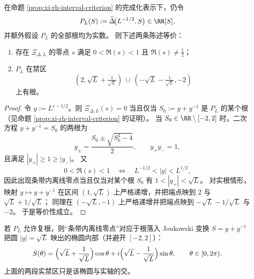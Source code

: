 \begin{proposition}\label{prop:xi-strip-forbidden-real}
在命题 \ref{prop:xi-rh-interval-criterion} 的完成化表示下，仍令
\[
P_L(S):=\widehat\Delta\!\bigl(L^{-1/2},S\bigr)\in\RR[S],
\]
并额外假设 \(P_L\) 的全部根均为实数。
则下述两条陈述等价：
\begin{enumerate}
  \item 存在 \(\Xi_{\Delta,L}\) 的零点 \(s\) 满足 \(0<\Re(s)<1\) 且 \(\Re(s)\neq \tfrac12\)；
  \item \(P_L\) 在禁区
  \[
  (2,\sqrt{L}+\tfrac{1}{\sqrt{L}})\ \cup\ (-\sqrt{L}-\tfrac{1}{\sqrt{L}},-2)
  \]
  上有根。
\end{enumerate}
\end{proposition}
\begin{proof}
令 \(y:=L^{s-1/2}\)。则 \(\Xi_{\Delta,L}(s)=0\) 当且仅当 \(S_0:=y+y^{-1}\) 是 \(P_L\) 的某个根（见命题 \ref{prop:xi-rh-interval-criterion} 的证明）。
当 \(S_0\in\RR\setminus[-2,2]\) 时，二次方程 \(y+y^{-1}=S_0\) 的两根为
\[
y_\pm=\frac{S_0\pm\sqrt{S_0^2-4}}{2},\qquad y_+y_-=1,
\]
且满足 \(|y_+|\ge 1\ge |y_-|\)。
又
\[
0<\Re(s)<1\quad\Longleftrightarrow\quad L^{-1/2}<|y|<L^{1/2},
\]
因此出现条带内离线零点当且仅当对某个根 \(S_0\) 有 \(1<|y_+|<\sqrt{L}\)。
对实根情形，映射 \(y\mapsto y+y^{-1}\) 在区间 \((1,\sqrt{L})\) 上严格递增，并把端点映到 \(2\) 与 \(\sqrt{L}+1/\sqrt{L}\)；
同理在 \((-\sqrt{L},-1)\) 上严格递增并把端点映到 \(-\sqrt{L}-1/\sqrt{L}\) 与 \(-2\)。
于是等价性成立。
\end{proof}

\begin{remark}\label{rem:xi-strip-ellipse-forbidden}
若 \(P_L\) 允许复根，则“条带内离线零点”对应于根落入 Joukowski 变换 \(S=y+y^{-1}\) 把圆 \(|y|=\sqrt{L}\) 映出的椭圆内部（并避开 \([-2,2]\)）：
\[
S(\theta)=\Bigl(\sqrt{L}+\frac{1}{\sqrt{L}}\Bigr)\cos\theta
+i\Bigl(\sqrt{L}-\frac{1}{\sqrt{L}}\Bigr)\sin\theta,\qquad \theta\in[0,2\pi).
\]
上面的两段实禁区只是该椭圆与实轴的交。
\end{remark}


